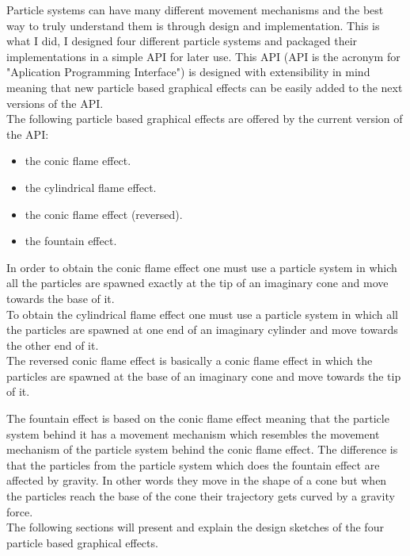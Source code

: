 Particle systems can have many different movement mechanisms and the best way to truly understand them is through design and implementation. This is what I did, I designed four different particle systems and packaged their implementations in a simple API for later use. This API (API is the acronym for "Aplication Programming Interface") is designed with extensibility in mind meaning that new particle based graphical effects can be easily added to the next versions of the API.\\

The following particle based graphical effects are offered by the current version of the API:

\begin{itemize}
	\item the conic flame effect.
	
	\item the cylindrical flame effect.
	
	\item the conic flame effect (reversed).
	
	\item the fountain effect.
\end{itemize}

In order to obtain the conic flame effect one must use a particle system in which all the particles are spawned exactly at the tip of an imaginary cone and move towards the base of it.\\

To obtain the cylindrical flame effect one must use a particle system in which all the particles are spawned at one end of an imaginary cylinder and move towards the other end of it.\\

The reversed conic flame effect is basically a conic flame effect in which the particles are spawned at the base of an imaginary cone and move towards the tip of it.

The fountain effect is based on the conic flame effect meaning that the particle system behind it has a movement mechanism which resembles the movement mechanism of the particle system behind the conic flame effect. The difference is that the particles from the particle system which does the fountain effect are affected by gravity. In other words they move in the shape of a cone but when the particles reach the base of the cone their trajectory gets curved by a gravity force.\\

The following sections will present and explain the design sketches of the four particle based graphical effects.

